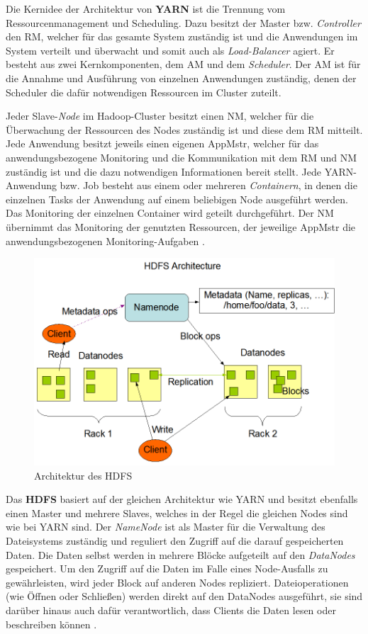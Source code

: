 Die Kernidee der Architektur von \textbf{YARN} ist die Trennung vom Ressourcenmanagement und Scheduling. Dazu besitzt der Master bzw. \emph{Controller} den \ac{RM}, welcher für das gesamte System zuständig ist und die Anwendungen im System verteilt und überwacht und somit auch als \emph{Load-Balancer} agiert. Er besteht aus zwei Kernkomponenten, dem \ac{AM} und dem \emph{Scheduler}. Der \ac{AM} ist für die Annahme und Ausführung von einzelnen Anwendungen zuständig, denen der Scheduler die dafür notwendigen Ressourcen im Cluster zuteilt.

Jeder Slave-\emph{Node} im Hadoop-Cluster besitzt einen \ac{NM}, welcher für die Überwachung der Ressourcen des Nodes zuständig ist und diese dem \ac{RM} mitteilt. Jede Anwendung besitzt jeweils einen eigenen \ac{AppMstr}, welcher für das anwendungsbezogene Monitoring und die Kommunikation mit dem \ac{RM} und \ac{NM} zuständig ist und die dazu notwendigen Informationen bereit stellt. Jede YARN-Anwendung bzw. Job besteht aus einem oder mehreren \emph{Containern}, in denen die einzelnen Tasks der Anwendung auf einem beliebigen Node ausgeführt werden. Das Monitoring der einzelnen Container wird geteilt durchgeführt. Der \ac{NM} übernimmt das Monitoring der genutzten Ressourcen, der jeweilige \ac{AppMstr} die anwendungsbezogenen Monitoring-Aufgaben \cite{HadoopYarnArch271}.

\begin{figure}
    \centering
    \includegraphics[width=.8\columnwidth]{./images/hdfsarchitecture.png}
    \caption[Architektur des HDFS]{Architektur des HDFS \cite{HadoopHdfsDesc271}}
    \label{fig:hdfsarch}
\end{figure}

Das \textbf{HDFS} basiert auf der gleichen Architektur wie YARN und besitzt ebenfalls einen Master und mehrere Slaves, welches in der Regel die gleichen Nodes sind wie bei YARN sind. Der \emph{NameNode} ist als Master für die Verwaltung des Dateisystems zuständig und reguliert den Zugriff auf die darauf gespeicherten Daten. Die Daten selbst werden in mehrere Blöcke aufgeteilt auf den \emph{DataNodes} gespeichert. Um den Zugriff auf die Daten im Falle eines Node-Ausfalls zu gewährleisten, wird jeder Block auf anderen Nodes repliziert. Dateioperationen (wie Öffnen oder Schließen) werden direkt auf den DataNodes ausgeführt, sie sind darüber hinaus auch dafür verantwortlich, dass Clients die Daten lesen oder beschreiben können \cite{HadoopHdfsDesc271}.

